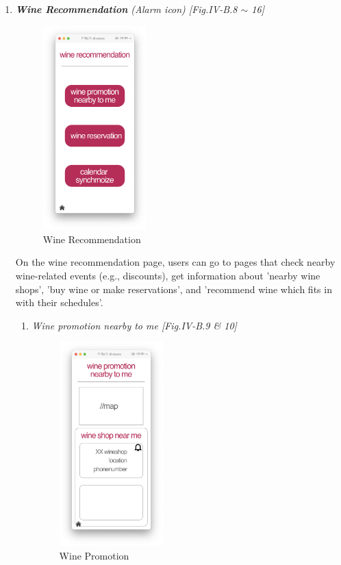 \documentclass[conference]{IEEEtran}
\numberwithin{figure}{subsection}
\begin{document}
\begin{enumerate}
\begin{enumerate}
        \item \textit{\textbf{Wine Recommendation} (Alarm icon) [Fig.IV-B.8 $\sim$ 16]}\\
        \begin{figure}[htb!]
            \centerline{\includegraphics[width=4cm]{winerec.png}}
            \caption{Wine Recommendation}
        \end{figure}
        On the wine recommendation page, users can go to pages that check nearby wine-related events (e.g., discounts), get information about 'nearby wine shops', 'buy wine or make reservations', and 'recommend wine which fits in with their schedules'. 
        \begin{enumerate}
            \item \textit{Wine promotion nearby to me [Fig.IV-B.9 \& 10]}
            \begin{enumerate}
                \begin{figure}[htb!]
                    \centerline{\includegraphics[width=4cm]{winepromo.png}}
                    \caption{Wine Promotion}

\end{figure}
\end{enumerate}
\end{enumerate}
\end{enumerate}
\end{enumerate}
\end{document}
